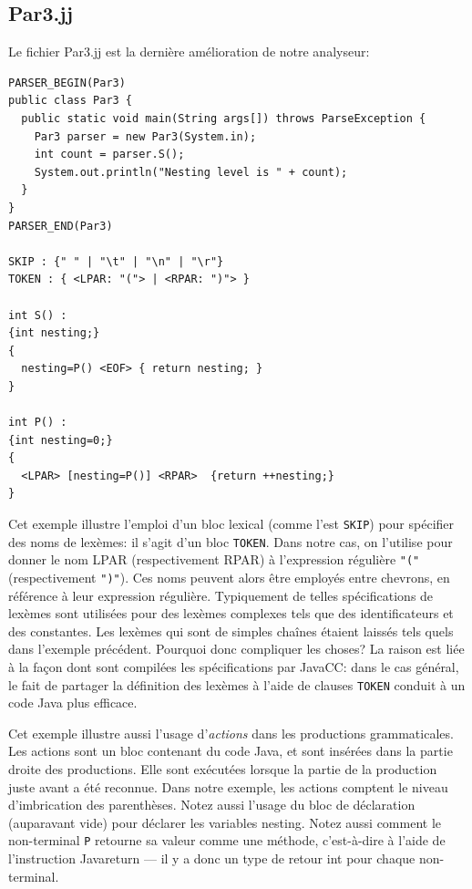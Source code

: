 \documentclass[11pt,a4paper]{article}
\newcommand{\Java}{\textsf{Java}\xspace}
\newcommand{\JavaCC}{\textsf{JavaCC}\xspace}
\begin{document}
\subsection{Par3.jj}

\noindent
Le fichier \textsf{Par3.jj} est la dernière amélioration de notre
analyseur:

{\small
\begin{verbatim}
PARSER_BEGIN(Par3)
public class Par3 {
  public static void main(String args[]) throws ParseException {
    Par3 parser = new Par3(System.in);
    int count = parser.S();
    System.out.println("Nesting level is " + count);
  }
}
PARSER_END(Par3)

SKIP : {" " | "\t" | "\n" | "\r"}
TOKEN : { <LPAR: "("> | <RPAR: ")"> }

int S() :
{int nesting;}
{
  nesting=P() <EOF> { return nesting; }
}

int P() :
{int nesting=0;}
{
  <LPAR> [nesting=P()] <RPAR>  {return ++nesting;}
}
\end{verbatim}
}

\noindent Cet exemple illustre l'emploi d'un bloc lexical (comme l'est
\texttt{SKIP}) pour spécifier des noms de lexèmes: il s'agit d'un bloc
\texttt{TOKEN}. Dans notre cas, on l'utilise pour donner le nom
\textsf{LPAR} (respectivement \textsf{RPAR}) à l'expression régulière
\verb+"("+ (respectivement \verb+")"+). Ces noms peuvent alors être
employés entre chevrons, en référence à leur expression
régulière. Typiquement de telles spécifications de lexèmes sont
utilisées pour des lexèmes complexes tels que des identificateurs et
des constantes. Les lexèmes qui sont de simples chaînes étaient
laissés tels quels dans l'exemple précédent. Pourquoi donc compliquer
les choses? La raison est liée à la façon dont sont compilées les
spécifications par \JavaCC: dans le cas général, le fait de partager
la définition des lexèmes à l'aide de clauses \texttt{TOKEN} conduit à
un code \Java plus efficace.

Cet exemple illustre aussi l'usage d'\emph{actions} dans les
productions grammaticales. Les actions sont un bloc contenant du code
\Java, et sont insérées dans la partie droite des productions. Elle
sont exécutées lorsque la partie de la production juste avant a été
reconnue. Dans notre exemple, les actions comptent le niveau
d'imbrication des parenthèses. Notez aussi l'usage du bloc de
déclaration (auparavant vide) pour déclarer les variables
\textsf{nesting}. Notez aussi comment le non-terminal \texttt{P}
retourne sa valeur comme une méthode, c'est-à-dire à l'aide de
l'instruction \Java \textsf{return} --- il y a donc un type de retour
\textsf{int} pour chaque non-terminal.
\end{document}
